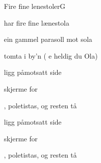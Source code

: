 \begin{SBSong}{Fire fine lenestoler}{G}
\begin{SBVerse}
  \end{SBVerse}
  \begin{SBChorus}
     har fire fine l\ae nestola

     ein gammel parasoll mot sola

     tomta i by'n ( e heldig du Ola)

      ligg p\aa motsatt side

     skjerme for 

    , poletistas, og resten t\aa {}

      ligg p\aa motsatt side

     skjerme for 

    , poletistas, og resten t\aa {}

  \end{SBChorus}
\end{SBSong}
